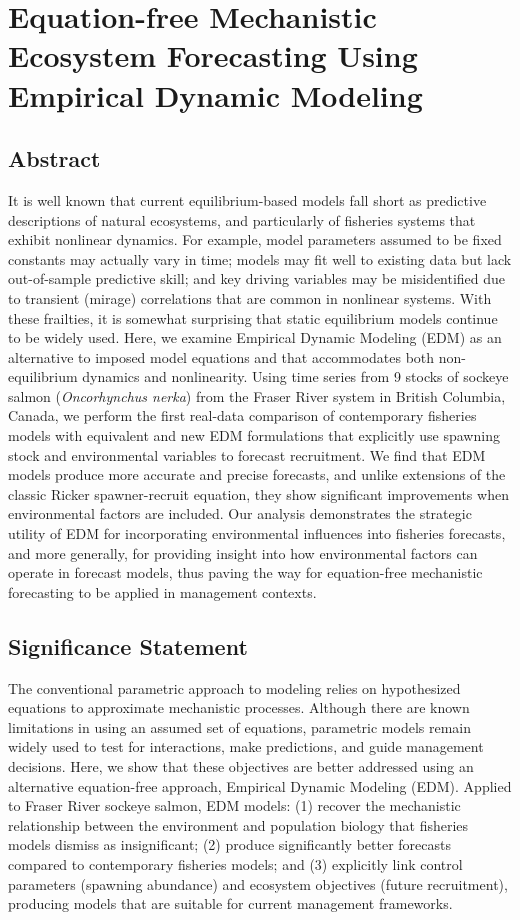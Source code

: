 \chapter{Equation-free Mechanistic Ecosystem Forecasting Using Empirical Dynamic Modeling}
\label{chap_salmon_environment}

\section{Abstract}
It is well known that current equilibrium-based models fall short as predictive descriptions of natural ecosystems, and particularly of fisheries systems that exhibit nonlinear dynamics. For example, model parameters assumed to be fixed constants may actually vary in time; models may fit well to existing data but lack out-of-sample predictive skill; and key driving variables may be misidentified due to transient (mirage) correlations that are common in nonlinear systems. With these frailties, it is somewhat surprising that static equilibrium models continue to be widely used. Here, we examine Empirical Dynamic Modeling (EDM) as an alternative to imposed model equations and that accommodates both non-equilibrium dynamics and nonlinearity. Using time series from 9 stocks of sockeye salmon (\emph{Oncorhynchus nerka}) from the Fraser River system in British Columbia, Canada, we perform the first real-data comparison of contemporary fisheries models with equivalent and new EDM formulations that explicitly use spawning stock and environmental variables to forecast recruitment. We find that EDM models produce more accurate and precise forecasts, and unlike extensions of the classic Ricker spawner-recruit equation, they show significant improvements when environmental factors are included. Our analysis demonstrates the strategic utility of EDM for incorporating environmental influences into fisheries forecasts, and more generally, for providing insight into how environmental factors can operate in forecast models, thus paving the way for equation-free mechanistic forecasting to be applied in management contexts.

\section{Significance Statement}
The conventional parametric approach to modeling relies on hypothesized equations to approximate mechanistic processes. Although there are known limitations in using an assumed set of equations, parametric models remain widely used to test for interactions, make predictions, and guide management decisions. Here, we show that these objectives are better addressed using an alternative equation-free approach, Empirical Dynamic Modeling (EDM). Applied to Fraser River sockeye salmon, EDM models: (1) recover the mechanistic relationship between the environment and population biology that fisheries models dismiss as insignificant; (2) produce significantly better forecasts compared to contemporary fisheries models; and (3) explicitly link control parameters (spawning abundance) and ecosystem objectives (future recruitment), producing models that are suitable for current management frameworks.

